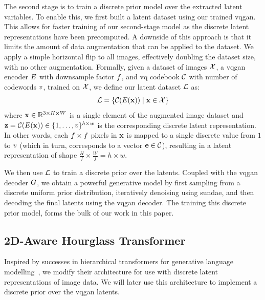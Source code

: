 The second stage is to train a discrete prior model over the extracted latent variables.
To enable this, we first built a latent dataset using our trained \gls{vqgan}.
This allows for faster training of our second-stage model as the discrete latent
representations have been precomputed. A downside of this approach is that it
limits the amount of data augmentation that can be applied to the dataset. We
apply a simple horizontal flip to all images, effectively doubling the dataset
size, with no other augmentation. Formally, given a dataset of images
$\mathcal{X}$, a \gls{vqgan} encoder $E$ with downsample factor
$f$, and \gls{vq} codebook $\mathcal{C}$ with
number of codewords $v$, trained on $\mathcal{X}$, we define our
latent dataset $\mathcal{L}$ as:
\begin{equation}
    \mathcal{L} = \{\mathcal{C}(E(\mathbf{x})) \mid \mathbf{x} \in \mathcal{X} \}
\end{equation}
where $\mathbf{x} \in \mathbb{R}^{3 \times H \times W}$ is a single element of the
augmented image
dataset and $\mathbf{z} = \mathcal{C}(E(\mathbf{x})) \in \{1, \dots,
v\}^{h \times w}$ is the corresponding discrete latent
representation. In other words, each $f \times f$
pixels in $\mathbf{x}$ is mapped to a single discrete value from $1$ to
$v$ (which in turn, corresponds to a vector $\mathbf{e} \in
\mathcal{C}$),
resulting in a latent representation of shape $\frac{H}{f} \times \frac{W}{f} =
h \times w$.

We then use $\mathcal{L}$ to train a discrete prior over the latents. Coupled
with the \gls{vqgan} decoder $G$, we obtain a powerful generative
model by first sampling from a discrete uniform prior distribution, iteratively
denoising using \gls{sundae}, and then decoding the final latents using the
\gls{vqgan} decoder. The training this discrete prior model, forms the bulk of our
work in this paper.

\subsection{2D-Aware Hourglass Transformer}
\label{subsec:improvedHourglass}

Inspired by successes in hierarchical transformers for generative language
modelling~\cite{nawrot2021hierarchical}, we modify their architecture for use
with discrete latent representations of image data. We will later use this
architecture to implement a discrete prior over the \gls{vqgan} latents. 

